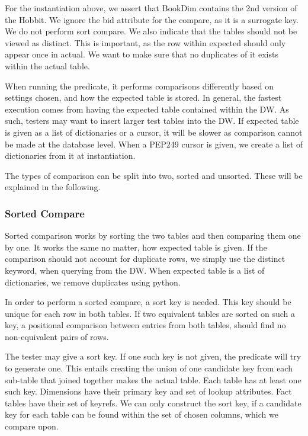 For the instantiation above, we assert that BookDim contains the 2nd version of the Hobbit. We ignore the bid attribute for the compare, as it is a surrogate key. We do not perform sort compare. We also indicate that the tables should not be viewed as distinct. This is important, as the row within expected should only appear once in actual. We want to make sure that no duplicates of it exists within the actual table.

When running the predicate, it performs comparisons differently based on settings chosen, and how the expected table is stored. In general, the fastest execution comes from having the expected table contained within the DW. As such, testers may want to insert larger test tables into the DW. If expected table is given as a list of dictionaries or a cursor, it will be slower as comparison cannot be made at the database level. When a PEP249 cursor is given, we create a list of dictionaries from it at instantiation.

The types of comparison can be split into two, sorted and unsorted. These will be explained in the following.

\subsubsection{Sorted Compare}
Sorted comparison works by sorting the two tables and then comparing them one by one. It works the same no matter, how expected table is given. If the comparison should not account for duplicate rows, we simply use the distinct keyword, when querying from the DW. When expected table is a list of dictionaries, we remove duplicates using python.

In order to perform a sorted compare, a sort key is needed. This key should be unique for each row in both tables. If two equivalent tables are sorted on such a key, a positional comparison between entries from both tables, should find no non-equivalent pairs of rows.

The tester may give a sort key. If one such key is not given, the predicate will try to generate one. This entails creating the union of one candidate key from each sub-table that joined together makes the actual table. Each table has at least one such key. Dimensions have their primary key and set of lookup attributes. Fact tables have their set of keyrefs. We can only construct the sort key, if a candidate key for each table can be found within the set of chosen columns, which we compare upon.

